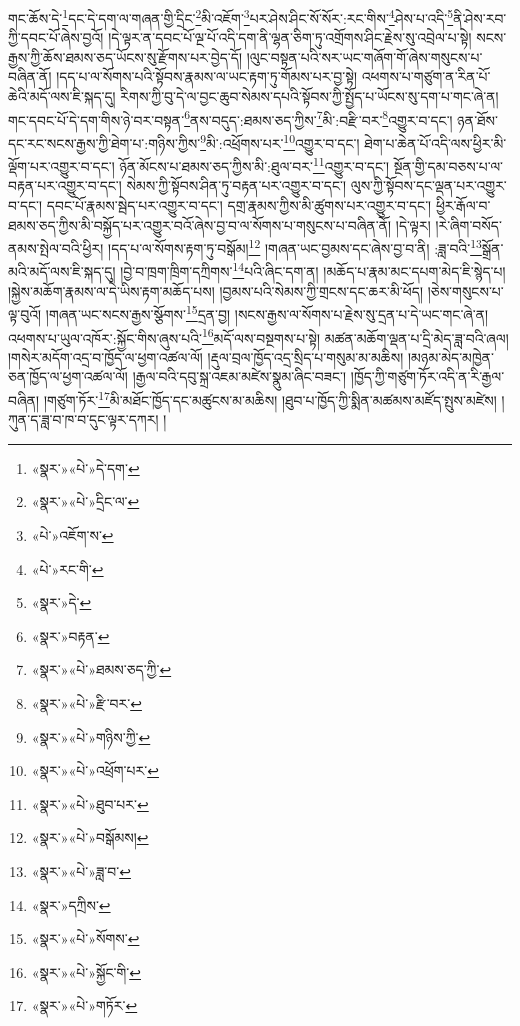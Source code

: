 གང་ཆོས་དེ་\footnote{«སྣར་»«པེ་»དེ་དག་}དང་དེ་དག་ལ་གཞན་གྱི་དྲིང་\footnote{«སྣར་»«པེ་»དྲིང་ལ་}མི་འཇོག་\footnote{«པེ་»འཇོག་ས་}པར་ཤེས་ཤིང་སོ་སོར་:རང་གིས་\footnote{«པེ་»རང་གི་}ཤེས་པ་འདི་\footnote{«སྣར་»དེ་}ནི་ཤེས་རབ་ཀྱི་དབང་པོ་ཞེས་བྱའོ། །དེ་ལྟར་ན་དབང་པོ་ལྔ་པོ་འདི་དག་ནི་ལྷན་ཅིག་ཏུ་འགྲོགས་ཤིང་རྗེས་སུ་འབྲེལ་པ་སྟེ། སངས་རྒྱས་ཀྱི་ཆོས་ཐམས་ཅད་ཡོངས་སུ་རྫོགས་པར་བྱེད་དོ། །ལུང་བསྟན་པའི་སར་ཡང་གཞོག་གོ་ཞེས་གསུངས་པ་བཞིན་ནོ། །དད་པ་ལ་སོགས་པའི་སྟོབས་རྣམས་ལ་ཡང་རྟག་ཏུ་གོམས་པར་བྱ་སྟེ། འཕགས་པ་གཙུག་ན་རིན་པོ་ཆེའི་མདོ་ལས་ཇི་སྐད་དུ། རིགས་ཀྱི་བུ་དེ་ལ་བྱང་ཆུབ་སེམས་དཔའི་སྟོབས་ཀྱི་སྤྱོད་པ་ཡོངས་སུ་དག་པ་གང་ཞེ་ན། གང་དབང་པོ་དེ་དག་གིས་ཉེ་བར་བསྟན་\footnote{«སྣར་»བརྟན་}ནས་བདུད་:ཐམས་ཅད་ཀྱིས་\footnote{«སྣར་»«པེ་»ཐམས་ཅད་ཀྱི་}མི་:བརྫི་བར་\footnote{«སྣར་»«པེ་»རྫི་བར་}འགྱུར་བ་དང་། ཉན་ཐོས་དང་རང་སངས་རྒྱས་ཀྱི་ཐེག་པ་:གཉིས་ཀྱིས་\footnote{«སྣར་»«པེ་»གཉིས་ཀྱི་}མི་:འཕྲོགས་པར་\footnote{«སྣར་»«པེ་»འཕྲོག་པར་}འགྱུར་བ་དང་། ཐེག་པ་ཆེན་པོ་འདི་ལས་ཕྱིར་མི་ལྡོག་པར་འགྱུར་བ་དང་། ཉོན་མོངས་པ་ཐམས་ཅད་ཀྱིས་མི་:ཐུལ་བར་\footnote{«སྣར་»«པེ་»ཐུབ་པར་}འགྱུར་བ་དང་། སྔོན་གྱི་དམ་བཅས་པ་ལ་བརྟན་པར་འགྱུར་བ་དང་། སེམས་ཀྱི་སྟོབས་ཤིན་ཏུ་བརྟན་པར་འགྱུར་བ་དང་། ལུས་ཀྱི་སྟོབས་དང་ལྡན་པར་འགྱུར་བ་དང་། དབང་པོ་རྣམས་སྦེད་པར་འགྱུར་བ་དང་། དགྲ་རྣམས་ཀྱིས་མི་ཚུགས་པར་འགྱུར་བ་དང་། ཕྱིར་རྒོལ་བ་ཐམས་ཅད་ཀྱིས་མི་བསྐྱོད་པར་འགྱུར་བའོ་ཞེས་བྱ་བ་ལ་སོགས་པ་གསུངས་པ་བཞིན་ནོ། །དེ་ལྟར། །རེ་ཞིག་བསོད་ནམས་སྤེལ་བའི་ཕྱིར། །དད་པ་ལ་སོགས་རྟག་ཏུ་བསྒོམ།\footnote{«སྣར་»«པེ་»བསྒོམས།} །གཞན་ཡང་བྱམས་དང་ཞེས་བྱ་བ་ནི། :ཟླ་བའི་\footnote{«སྣར་»«པེ་»ཟླ་བ་}སྒྲོན་མའི་མདོ་ལས་ཇི་སྐད་དུ། །བྱེ་བ་ཁྲག་ཁྲིག་དཀྲིགས་\footnote{«སྣར་»དཀྲིས་}པའི་ཞིང་དག་ན། །མཆོད་པ་རྣམ་མང་དཔག་མེད་ཇི་སྙེད་པ། །སྐྱེས་མཆོག་རྣམས་ལ་དེ་ཡིས་རྟག་མཆོད་པས། །བྱམས་པའི་སེམས་ཀྱི་གྲངས་དང་ཆར་མི་ཕོད། །ཅེས་གསུངས་པ་ལྟ་བུའོ། །གཞན་ཡང་སངས་རྒྱས་སྩོགས་\footnote{«སྣར་»«པེ་»སོགས་}དྲན་བྱ། །སངས་རྒྱས་ལ་སོགས་པ་རྗེས་སུ་དྲན་པ་དེ་ཡང་གང་ཞེ་ན། འཕགས་པ་ཡུལ་འཁོར་:སྐྱོང་གིས་ཞུས་པའི་\footnote{«སྣར་»«པེ་»སྐྱོང་གི་}མདོ་ལས་བསྔགས་པ་སྟེ། མཚན་མཆོག་ལྡན་པ་དྲི་མེད་ཟླ་བའི་ཞལ། །གསེར་མདོག་འདྲ་བ་ཁྱོད་ལ་ཕྱག་འཚལ་ལོ། །རྡུལ་བྲལ་ཁྱོད་འདྲ་སྲིད་པ་གསུམ་མ་མཆིས། །མཉམ་མེད་མཁྱེན་ཅན་ཁྱོད་ལ་ཕྱག་འཚལ་ལོ། །རྒྱལ་བའི་དབུ་སྐྲ་འཇམ་མཛེས་སྣུམ་ཞིང་བཟང་། །ཁྱོད་ཀྱི་གཙུག་ཏོར་འདི་ན་རི་རྒྱལ་བཞིན། །གཙུག་ཏོར་\footnote{«སྣར་»«པེ་»གཏོར་}མི་མཐོང་ཁྱོད་དང་མཚུངས་མ་མཆིས། །ཐུབ་པ་ཁྱོད་ཀྱི་སྨིན་མཚམས་མཛོད་སྤུས་མཛེས། །ཀུན་ད་ཟླ་བ་ཁ་བ་དུང་ལྟར་དཀར། །
